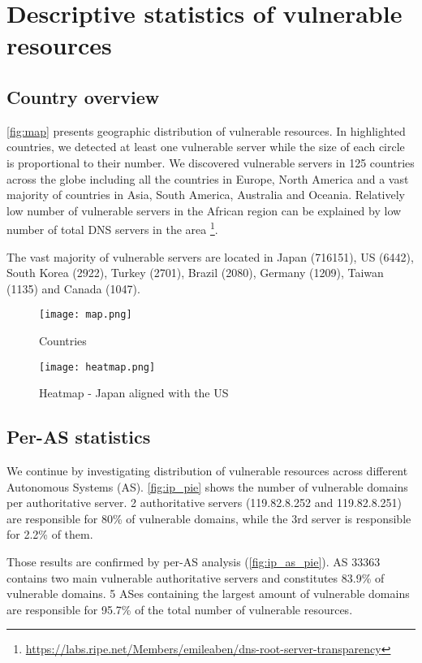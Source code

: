 \section{Descriptive statistics of vulnerable resources}
\subsection{Country overview}
\autoref{fig:map} presents geographic distribution of vulnerable resources. In highlighted countries, we detected at least one vulnerable server while the size of each circle is proportional to their number. We discovered vulnerable servers in 125 countries across the globe including all the countries in Europe, North America and a vast majority of countries in Asia, South America, Australia and Oceania. Relatively low number of vulnerable servers in the African region can be explained by low number of total DNS servers in the area \footnote{\url{https://labs.ripe.net/Members/emileaben/dns-root-server-transparency}}. 

The vast majority of vulnerable servers are located in Japan (716151), US (6442), South Korea (2922), Turkey (2701), Brazil (2080), Germany (1209), Taiwan (1135) and Canada (1047). 

\begin{figure}[!hbt]
\centering
\texttt{[image: map.png]}
\caption{Countries}
\label{fig:map}
\end{figure}

\begin{figure}[!hbt]
\centering
\texttt{[image: heatmap.png]}
\caption{Heatmap - Japan aligned with the US}
\label{fig:heatmap}
\end{figure}

\subsection{Per-AS statistics}
We continue by investigating distribution of vulnerable resources across different Autonomous Systems (AS). \autoref{fig:ip_pie} shows the number of vulnerable domains per authoritative server. 2 authoritative servers (119.82.8.252 and 119.82.8.251) are responsible for 80\% of vulnerable domains, while the 3rd server is responsible for 2.2\% of them. 

Those results are confirmed by per-AS analysis (\autoref{fig:ip_as_pie}). AS 33363 contains two main vulnerable authoritative servers and constitutes 83.9\% of vulnerable domains. 5 ASes containing the largest amount of vulnerable domains are responsible for 95.7\% of the total number of vulnerable resources. 

